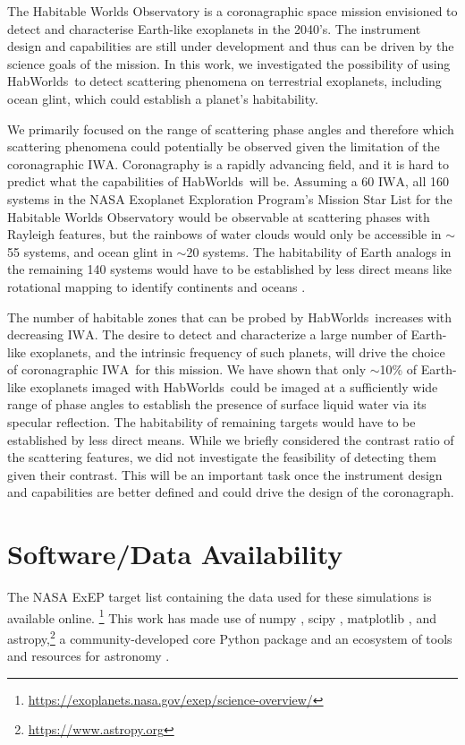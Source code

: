 \documentclass[
    usenatbib,
]{mnras}
\newcommand{\IWA}{\ensuremath{\mathrm{IWA}}}
\newcommand{\hwo}{HabWorlds}
\begin{document}
The Habitable Worlds Observatory is a coronagraphic space mission envisioned to detect and characterise Earth-like exoplanets in the 2040's. 
%
The instrument design and capabilities are still under development and thus can be driven by the science goals of the mission.
%
In this work, we investigated the possibility of using \hwo\ to detect scattering phenomena on terrestrial exoplanets, including ocean glint, which could establish a planet's habitability. 

We primarily focused on the range of scattering phase angles and therefore which scattering phenomena could potentially be observed given the limitation of the coronagraphic \IWA.
%
Coronagraphy is a rapidly advancing field, and it is hard to predict what the capabilities of \hwo\ will be.
%
Assuming a \SI{60}{\mas} \IWA, all 160 systems in the NASA Exoplanet Exploration Program's Mission Star List for the Habitable Worlds Observatory would be observable at scattering phases with Rayleigh features, but the rainbows of water clouds would only be accessible in $\sim$55 systems, and ocean glint in $\sim$20 systems.  The habitability of Earth analogs in the remaining 140 systems would have to be established by less direct means like rotational mapping to identify continents and oceans \citep[e.g.,][]{2009ApJ...700..915C,lustig2019}.   
%

The number of habitable zones that can be probed by \hwo\ increases with decreasing \IWA. 
%
The desire to detect and characterize a large number of Earth-like exoplanets, and the intrinsic frequency of such planets, will drive the choice of coronagraphic \IWA\ for this mission.
%
We have shown that only $\sim$10\% of Earth-like exoplanets imaged with \hwo\ could be imaged at a sufficiently wide range of phase angles to establish the presence of surface liquid water via its specular reflection.  
%
The habitability of remaining targets would have to be established by less direct means.
%
While we briefly considered the contrast ratio of the scattering features, we did not investigate the feasibility of detecting them given their contrast. 
%
This will be an important task once the instrument design and capabilities are better defined and could drive the design of the coronagraph. 


\section*{Software/Data Availability}

The NASA ExEP target list containing the data used for these simulations is available online.%
\footnote{\url{https://exoplanets.nasa.gov/exep/science-overview/}}
This work has made use of \textsf{numpy}
 \citep{NumPy2020}, \textsf{scipy} \citep{scipy_2020}, \textsf{matplotlib} \citep{matplotlib2007}, and \textsf{astropy},\footnote{\url{https://www.astropy.org}} a community-developed core Python package and an ecosystem of tools and resources for astronomy \citep{astropy:2013, astropy:2018, astropy:2022}.
\end{document}
